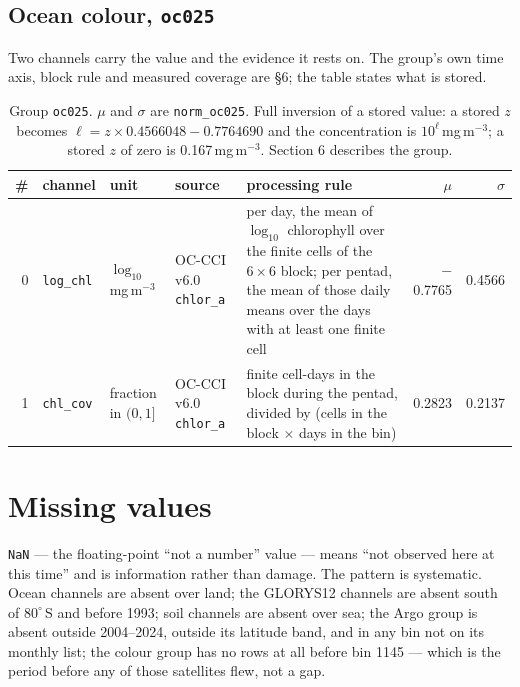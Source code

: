 \documentclass[10pt]{article}
\newcommand{\code}[1]{\texttt{#1}}
\begin{document}
\subsection{Ocean colour, \code{oc025}}

Two channels carry the value and the evidence it rests on. The group's own
time axis, block rule and measured coverage are \S6; the table states what is
stored.

\begin{table}[h]
\centering\setlength{\tabcolsep}{4pt}\footnotesize
\begin{tabular}{@{}rl>{\raggedright\arraybackslash}p{2.1cm}>{\raggedright\arraybackslash}p{2.1cm}>{\raggedright\arraybackslash}p{4.6cm}rr@{}}
\toprule
\# & channel & unit & source & processing rule & $\mu$ & $\sigma$ \\
\midrule
0 & \code{log\_chl} & $\log_{10}$\,mg\,m$^{-3}$ & OC-CCI v6.0 \code{chlor\_a} & per day, the mean of $\log_{10}$ chlorophyll over the finite cells of the $6\times6$ block; per pentad, the mean of those daily means over the days with at least one finite cell & $-$0.7765 & 0.4566 \\
1 & \code{chl\_cov} & fraction in $(0,1]$ & OC-CCI v6.0 \code{chlor\_a} & finite cell-days in the block during the pentad, divided by (cells in the block $\times$ days in the bin) & 0.2823 & 0.2137 \\
\bottomrule
\end{tabular}
\caption{Group \code{oc025}. $\mu$ and $\sigma$ are \code{norm\_oc025}. Full
inversion of a stored value: a stored $z$ becomes
$\ell = z \times 0.4566048 - 0.7764690$ and the concentration is
$10^{\ell}$\,mg\,m$^{-3}$; a stored $z$ of zero is 0.167\,mg\,m$^{-3}$. Section 6 describes the group.}
\end{table}

\section{Missing values}

\code{NaN} --- the floating-point ``not a number'' value --- means ``not
observed here at this time'' and is information rather
than damage. The pattern is systematic. Ocean channels are absent over land;
the GLORYS12 channels are absent south of $80^\circ$\,S and before 1993; soil
channels are absent over sea; the Argo group is absent outside 2004--2024,
outside its latitude band, and in any bin not on its monthly list; the colour
group has no rows at all before bin 1145 --- which is the period before any of
those satellites flew, not a gap.
\end{document}
